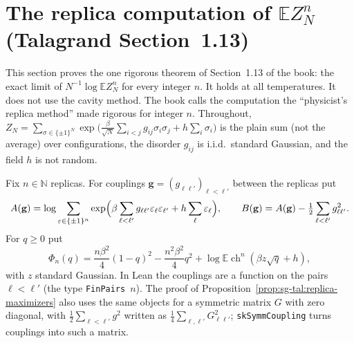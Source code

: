 \section{The replica computation of $\mathbb E Z_N^n$ (Talagrand Section~1.13)}\label{sec:sg-tal:replica}

This section proves the one rigorous theorem of Section~1.13 of the book: the exact limit of $N^{-1}\log\mathbb E Z_N^n$ for every integer $n$.
It holds at all temperatures. It does not use the cavity method. The book calls the computation the ``physicist's replica method'' made rigorous for integer $n$.
Throughout, $Z_N=\sum_{\sigma\in\{\pm1\}^N}\exp\bigl(\frac{\beta}{\sqrt N}\sum_{i<j}g_{ij}\sigma_i\sigma_j+h\sum_i\sigma_i\bigr)$ is the plain sum (not the average) over configurations,
the disorder $g_{ij}$ is i.i.d.\ standard Gaussian, and the field $h$ is not random.

\begin{definition}\label{def:sg-tal:replica-A}
\leanok
{}
Fix $n\in\mathbb N$ replicas. For couplings $\mathbf g=(g_{\ell\ell'})_{\ell<\ell'}$ between the replicas put
\[
A(\mathbf g)=\log\sum_{\varepsilon\in\{\pm1\}^n}\exp\Bigl(\beta\sum_{\ell<\ell'}g_{\ell\ell'}\varepsilon_\ell\varepsilon_{\ell'}+h\sum_\ell\varepsilon_\ell\Bigr),
\qquad B(\mathbf g)=A(\mathbf g)-\tfrac12\sum_{\ell<\ell'}g_{\ell\ell'}^2 .
\]
For $q\ge0$ put
\[
\Phi_n(q)=\frac{n\beta^2}{4}(1-q)^2-\frac{n^2\beta^2}{4}q^2+\log\mathbb E\operatorname{ch}^n(\beta z\sqrt q+h),
\]
with $z$ standard Gaussian. In Lean the couplings are a function on the pairs $\ell<\ell'$ (the type \texttt{FinPairs}~$n$).
The proof of Proposition~\ref{prop:sg-tal:replica-maximizers} also uses the same objects for a symmetric matrix $G$ with zero diagonal,
with $\tfrac12\sum_{\ell<\ell'}g^2$ written as $\tfrac14\sum_{\ell,\ell'}G_{\ell\ell'}^2$; \texttt{skSymmCoupling} turns couplings into such a matrix.
\end{definition}

